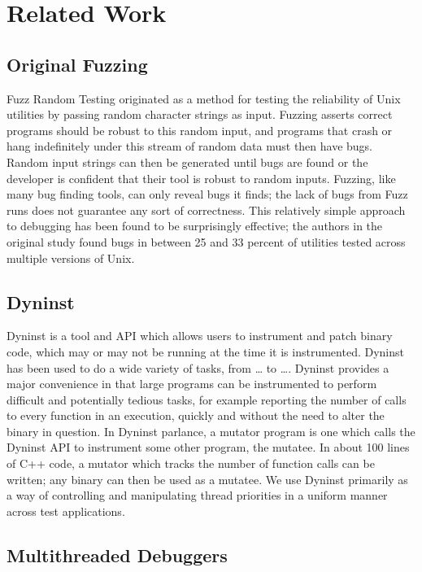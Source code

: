 \documentclass[10pt,]{article} %
\begin{document}
\section{Related Work}


\subsection{Original Fuzzing}


Fuzz Random Testing originated as a method for testing the reliability of Unix utilities by passing random character strings as input.  Fuzzing asserts correct programs should be robust to this random input, and programs that crash or hang indefinitely under this stream of random data must then have bugs. Random input strings can then be generated until bugs are found or the developer is confident that their tool is robust to random inputs.  Fuzzing, like many bug finding tools, can only reveal bugs it finds; the lack of bugs from Fuzz runs does not guarantee any sort of correctness.  This relatively simple approach to debugging has been found to be surprisingly effective; the authors in the original study found bugs in between 25 and 33 percent of utilities tested across multiple versions of Unix.      



\subsection{Dyninst}

Dyninst is a tool and API which allows users to instrument and patch binary code, which may or may not be running at the time it is instrumented.  Dyninst has been used to do a wide variety of tasks, from … to ….  Dyninst provides a major convenience in that large programs can be instrumented to perform difficult and potentially tedious tasks, for example reporting the number of calls to every function in an execution, quickly and without the need to alter the binary in question.  In Dyninst parlance, a mutator program is one which calls the Dyninst API to instrument some other program, the mutatee.   In about 100 lines of C++ code, a mutator which tracks the number of function calls can be written; any binary can then be used as a mutatee.  We use Dyninst primarily as a way of controlling and manipulating thread priorities in a uniform manner across test applications.  



\subsection{Multithreaded Debuggers}
\end{document}
